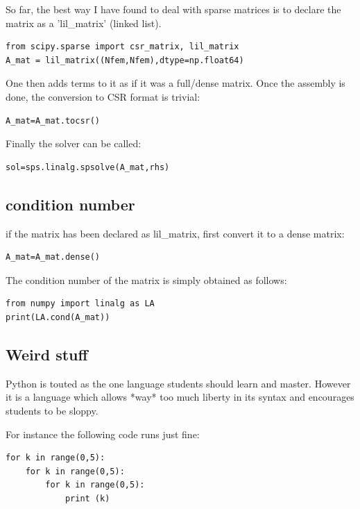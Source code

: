 So far, the best way I have found to deal with sparse matrices is to 
declare the matrix as a 'lil\_matrix' (linked list).

\begin{lstlisting}
from scipy.sparse import csr_matrix, lil_matrix
A_mat = lil_matrix((Nfem,Nfem),dtype=np.float64)
\end{lstlisting}

One then adds terms to it as if it was a full/dense matrix. 
Once the assembly is done, the conversion to CSR format is trivial:

\begin{lstlisting}
A_mat=A_mat.tocsr()
\end{lstlisting}

Finally the solver can be called:

\begin{lstlisting}
sol=sps.linalg.spsolve(A_mat,rhs)
\end{lstlisting}

\subsection{condition number}

if the matrix has been declared as lil\_matrix, first convert it to a dense matrix:
\begin{lstlisting}
A_mat=A_mat.dense()
\end{lstlisting}
The condition number of the matrix is simply obtained as follows:
\begin{lstlisting}
from numpy import linalg as LA
print(LA.cond(A_mat))
\end{lstlisting}

\subsection{Weird stuff}

Python is touted as the one language students should learn 
and master. However it is a language which allows *way* too 
much liberty in its syntax and encourages students to be sloppy. 

For instance the following code runs just fine:

\begin{lstlisting}
for k in range(0,5): 
    for k in range(0,5):
        for k in range(0,5):
            print (k)
\end{lstlisting}

